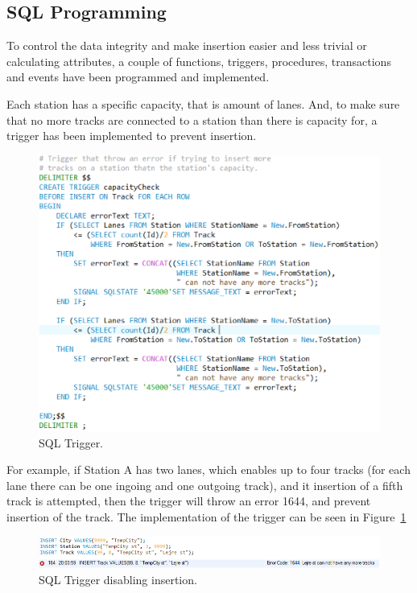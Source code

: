 \subsection{SQL Programming} \label{sec:sql:programming}
To control the data integrity and make insertion easier and less trivial or 
calculating attributes, a couple of functions, triggers, procedures, 
transactions and events have been programmed and implemented.

Each station has a specific capacity, that is amount of lanes. And, to make 
sure that no more tracks are connected to a station than there is capacity for, 
a trigger has been implemented to prevent insertion.

\begin{figure}[ht!]
    \centering
    \includegraphics[scale=.75]{img/SQL_TRIGGER}
    \caption{SQL Trigger.}
    \label{fig:trigger}
\end{figure}

For example, if Station A has two lanes, which enables up to four tracks (for 
each lane there can be one ingoing and one outgoing track), and it insertion of 
a fifth track is attempted, then the trigger will throw an error 1644, and 
prevent insertion of the track. The implementation of the trigger can be seen 
in Figure~\ref{fig:trigger}

\begin{figure}[ht!]
    \centering
    \includegraphics[width=\textwidth]{img/SQL_TRIGGER_example}
    \caption{SQL Trigger disabling insertion.}
    \label{fig:trigger2}
\end{figure}

